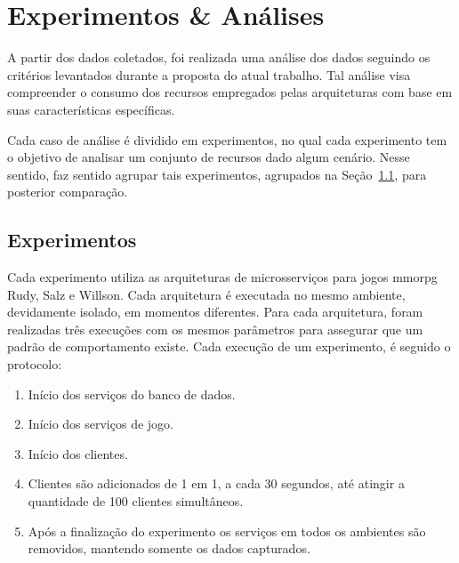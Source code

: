 \chapter{Experimentos \& Análises}
\label{cap6}



A partir dos dados coletados, foi realizada uma análise dos dados seguindo os critérios levantados durante a proposta do atual trabalho.
%
Tal análise visa compreender o consumo dos recursos empregados pelas arquiteturas com base em suas características específicas.



Cada caso de análise é dividido em experimentos, no qual cada experimento tem o objetivo de analisar um conjunto de recursos dado algum cenário.
%
Nesse sentido, faz sentido agrupar tais experimentos, agrupados na Seção~\ref{sec:experimentos}, para posterior comparação. %





\section{Experimentos}
\label{sec:experimentos}

Cada experimento utiliza as arquiteturas de microsserviços para jogos \ac{mmorpg} Rudy, Salz e Willson.
%
Cada arquitetura é executada no mesmo ambiente, devidamente isolado, em momentos diferentes.
%
Para cada arquitetura, foram realizadas três execuções com os mesmos parâmetros para assegurar que um padrão de comportamento existe.
%
Cada execução de um experimento, é seguido o protocolo:


\begin{enumerate}
 \item Início dos serviços do banco de dados.
 \item Início dos serviços de jogo.
 \item Início dos clientes.
 \item Clientes são adicionados de 1 em 1, a cada 30 segundos, até atingir a quantidade de 100 clientes simultâneos.
 \item Após a finalização do experimento os serviços em todos os ambientes são removidos, mantendo somente os dados capturados.
\end{enumerate}


